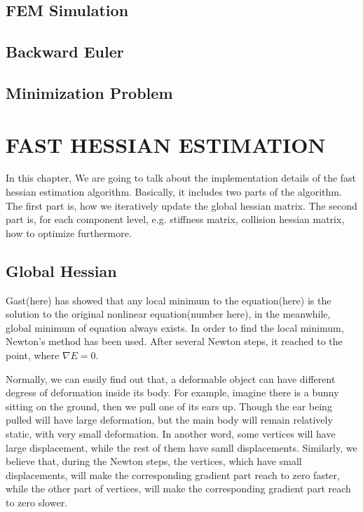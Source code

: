 \documentclass[
	11pt, 
	a4paper, 
	oneside,  
	final, 
]{report}
\begin{document}
\section{FEM Simulation}
\section{Backward Euler}
\section{Minimization Problem}
\chapter{FAST HESSIAN ESTIMATION}
In this chapter, We are going to talk about the implementation details of the fast hessian estimation algorithm. Basically, it includes two parts of the algorithm. The first part is, how we iteratively update the global hessian matrix. The second part is, for each component level, e.g. stiffness matrix, collision hessian matrix, how to optimize furthermore.
\section{Global Hessian}

Gast(here) has showed that any local minimum to the equation(here) is the solution to the original nonlinear equation(number here), in the meanwhile, global minimum of equation always exists. In order to find the local minimum, Newton's method has been used. After several Newton steps, it reached to the point, where $\nabla E = 0$. 

Normally, we can easily find out that, a deformable object can have different degress of deformation inside its body. For example, imagine there is a bunny sitting on the ground, then we pull one of its ears up. Though the ear being pulled will have large deformation, but the main body will remain relatively static, with very small deformation. In another word, some vertices will have large displacement, while the rest of them have samll displacements. Similarly, we believe that, during the Newton steps, the vertices, which have small displacements, will make the corresponding gradient part reach to zero faster, while the other part of vertices, will make the corresponding gradient part reach to zero slower.
\end{document}
